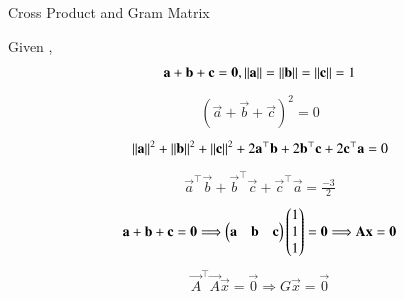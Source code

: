 \documentclass{beamer}
\begin{document}
\begin{frame}{Cross Product and Gram Matrix}

Given ,
\begin{align}
\mathbf{a}+\mathbf{b}+\mathbf{c} = \mathbf{0} , \left\lVert\mathbf{a}\right\rVert = \left\lVert\mathbf{b}\right\rVert = \left\lVert\mathbf{c}\right\rVert = 1
\end{align}
\begin{align}
(\vec{a}+\vec{b}+\vec{c})^2 = 0
\end{align}
\begin{align}
{\left\lVert\mathbf{a}\right\rVert}^2+{\left\lVert\mathbf{b}\right\rVert}^2+{\left\lVert\mathbf{c}\right\rVert}^2+2\mathbf{a}^\top\mathbf{b}+2\mathbf{b}^\top\mathbf{c}+2\mathbf{c}^\top\mathbf{a} = 0
\end{align}
\begin{align}
\vec{a}^\top\vec{b}+\vec{b}^\top\vec{c}+\vec{c}^\top\vec{a} = \frac{-3}{2}
\end{align}
\begin{align}
\mathbf{a}+\mathbf{b}+\mathbf{c}=\mathbf{0} \Longrightarrow \begin{pmatrix}\mathbf{a} & \mathbf{b} & \mathbf{c}\end{pmatrix}\begin{pmatrix}1 \\1\\1\end{pmatrix} = \mathbf{0} \Longrightarrow
\mathbf{A}\mathbf{x} = \mathbf{0} 
\end{align}
\begin{align}
\vec{A}^\top\vec{A}\vec{x} = \vec{0} \Longrightarrow G\vec{x}=\vec{0}
\end{align}
\end{frame}
\end{document}
